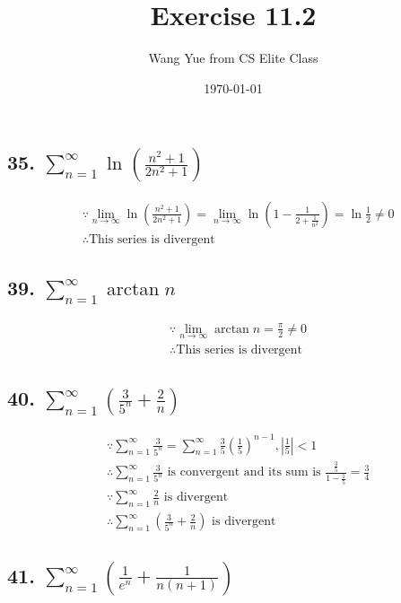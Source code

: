 \documentclass{article}
\begin{document}
    \title{Exercise 11.2}
    \author{Wang Yue from CS Elite Class}
    \date{\today}

    \maketitle

    \subsection*{35. $\sum_{n=1}^\infty \ln(\frac{n^2+1}{2n^2+1})$}

    $$\begin{aligned}
        & \because \lim_{n \to \infty}\ln(\frac{n^2+1}{2n^2+1}) = \lim_{n \to \infty}\ln (1 - \frac{1}{2 + \frac{1}{n^2}}) = \ln \frac 1 2 \not = 0\\
        & \therefore \textrm{This series is divergent}
    \end{aligned}$$

    \subsection*{39. $\sum_{n=1}^\infty \arctan n$}

    $$\begin{aligned}
        & \because \lim_{n \to \infty}\arctan n = \frac \pi 2 \not = 0 \\ 
        & \therefore \textrm{This series is divergent}
    \end{aligned}$$

    \subsection*{40. $\sum_{n=1}^\infty (\frac{3}{5^n} + \frac{2}{n})$}

    $$\begin{aligned}
        & \because \sum_{n=1}^\infty \frac{3}{5^n} = \sum_{n=1}^\infty \frac 3 5 (\frac 1 5)^{n-1}, |\frac 1 5| < 1 \\ 
        & \therefore \sum_{n=1}^\infty \frac{3}{5^n} \textrm{ is convergent and its sum is } \frac{\frac 3 5}{1 - \frac 1 5} = \frac 3 4 \\
        & \because \sum_{n=1}^\infty \frac 2 n \textrm{ is divergent } \\
        & \therefore \sum_{n=1}^\infty (\frac{3}{5^n} + \frac{2}{n}) \textrm{ is divergent}
    \end{aligned}$$

    \subsection*{41. $\sum_{n=1}^\infty (\frac{1}{e^n} + \frac{1}{n(n+1)})$}
\end{document}
